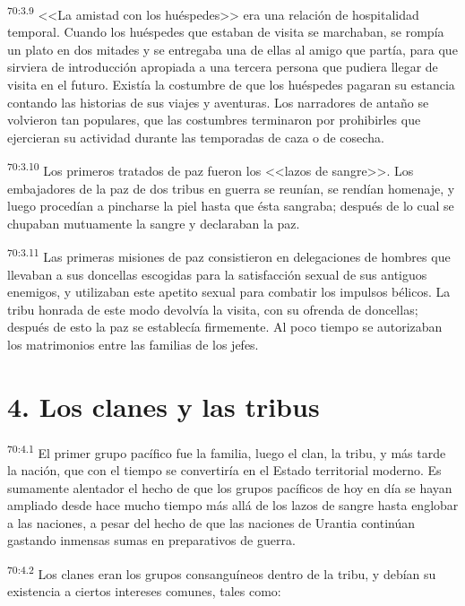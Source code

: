 \par
\textsuperscript{70:3.9} <<La amistad con los huéspedes>> era una relación de hospitalidad temporal. Cuando los huéspedes que estaban de visita se marchaban, se rompía un plato en dos mitades y se entregaba una de ellas al amigo que partía, para que sirviera de introducción apropiada a una tercera persona que pudiera llegar de visita en el futuro. Existía la costumbre de que los huéspedes pagaran su estancia contando las historias de sus viajes y aventuras. Los narradores de antaño se volvieron tan populares, que las costumbres terminaron por prohibirles que ejercieran su actividad durante las temporadas de caza o de cosecha.

\par
\textsuperscript{70:3.10} Los primeros tratados de paz fueron los <<lazos de sangre>>. Los embajadores de la paz de dos tribus en guerra se reunían, se rendían homenaje, y luego procedían a pincharse la piel hasta que ésta sangraba; después de lo cual se chupaban mutuamente la sangre y declaraban la paz.

\par
\textsuperscript{70:3.11} Las primeras misiones de paz consistieron en delegaciones de hombres que llevaban a sus doncellas escogidas para la satisfacción sexual de sus antiguos enemigos, y utilizaban este apetito sexual para combatir los impulsos bélicos. La tribu honrada de este modo devolvía la visita, con su ofrenda de doncellas; después de esto la paz se establecía firmemente. Al poco tiempo se autorizaban los matrimonios entre las familias de los jefes.

\section*{4. Los clanes y las tribus}
\par
\textsuperscript{70:4.1} El primer grupo pacífico fue la familia, luego el clan, la tribu, y más tarde la nación, que con el tiempo se convertiría en el Estado territorial moderno. Es sumamente alentador el hecho de que los grupos pacíficos de hoy en día se hayan ampliado desde hace mucho tiempo más allá de los lazos de sangre hasta englobar a las naciones, a pesar del hecho de que las naciones de Urantia continúan gastando inmensas sumas en preparativos de guerra.

\par
\textsuperscript{70:4.2} Los clanes eran los grupos consanguíneos dentro de la tribu, y debían su existencia a ciertos intereses comunes, tales como:

